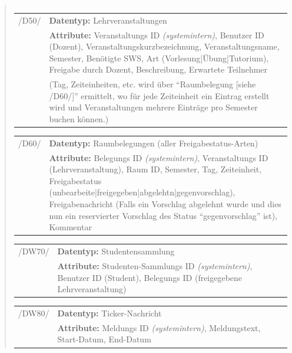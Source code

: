 \begin{quote}
\begin{tabular}{p{1.5cm}p{14.5cm}}
\end{tabular}


\begin{tabular}{p{1.5cm}p{14.5cm}}
	
	 /D50/	& \textbf{Datentyp:} Lehrveranstaltungen \\
				& \textbf{Attribute:} Veranstaltungs ID \textsl{(systemintern)}, Benutzer ID (Dozent), Veranstaltungskurzbezeichnung, Veranstaltungsname, Semester, Benötigte SWS, Art (Vorlesung|Übung|Tutorium), Freigabe durch Dozent, Beschreibung, Erwartete Teilnehmer\\ 
				&(Tag, Zeiteinheiten, etc. wird über "`Raumbelegung [siehe /D60/]"' ermittelt, wo für jede Zeiteinheit ein Eintrag erstellt wird und Veranstaltungen mehrere Einträge pro Semester buchen können.) \\[0.25cm]

\end{tabular}


\begin{tabular}{p{1.5cm}p{14.5cm}}
					
	 /D60/	& \textbf{Datentyp:} Raumbelegungen (aller Freigabestatus-Arten) \\
				& \textbf{Attribute:} Belegungs ID \textsl{(systemintern)}, Veranstaltungs ID (Lehrveranstaltung), Raum ID, Semester, Tag, Zeiteinheit, Freigabestatus (unbearbeite|freigegeben|abgelehtn|gegenvorschlag), Freigabenachricht (Falls ein Vorschlag abgelehnt wurde und dies nun ein reservierter Vorschlag des Status "`gegenvorschlag"' ist), Kommentar  \\[0.25cm]

\end{tabular}


\begin{tabular}{p{1.5cm}p{14.5cm}}
		
	 /DW70/& \textbf{Datentyp:} Studentensammlung \\
				& \textbf{Attribute:} Studenten-Sammlungs ID \textsl{(systemintern)}, Benutzer ID (Student), Belegungs ID (freigegebene Lehrveranstaltung) \\[0.25cm]

\end{tabular}


\begin{tabular}{p{1.5cm}p{14.5cm}}
					
	 /DW80/& \textbf{Datentyp:} Ticker-Nachricht \\
				& \textbf{Attribute:} Meldungs ID \textsl{(systemintern)}, Meldungstext, Start-Datum, End-Datum \\[0.25cm]
		

\end{tabular}
\end{quote}
